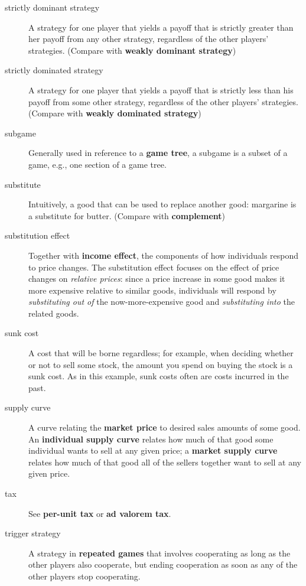 \begin{description}
\item[strictly dominant strategy] A strategy for one player that yields a payoff that is strictly greater than her payoff from any other strategy, regardless of the other players' strategies. (Compare with \textbf{weakly dominant strategy})

\item[strictly dominated strategy] A strategy for one player that yields a payoff that is strictly less than his payoff from some other strategy, regardless of the other players' strategies. (Compare with \textbf{weakly dominated strategy})

\item[subgame] Generally used in reference to a \textbf{game tree}, a subgame is a subset of a game, e.g., one section of a game tree.

\item[substitute] Intuitively, a good that can be used to replace another good: margarine is a substitute for butter.  (Compare with \textbf{complement})

\item[substitution effect] Together with \textbf{income effect}, the components of how individuals respond to price changes. The substitution effect focuses on the effect of price changes on \emph{relative prices}: since a price increase in some good makes it more expensive relative to similar goods, individuals will respond by \emph{substituting out of} the now-more-expensive good and \emph{substituting into} the related goods. 

\item[sunk cost] A cost that will be borne regardless; for example, when deciding whether or not to sell some stock, the amount you spend on buying the stock is a sunk cost. As in this example, sunk costs often are costs incurred in the past.

\item[supply curve] A curve relating the \textbf{market price} to desired sales amounts of some good. An \textbf{individual supply curve} relates how much of that good some individual wants to sell at any given price; a \textbf{market supply curve} relates how much of that good all of the sellers together want to sell at any given price.

\item[tax] See \textbf{per-unit tax} or \textbf{ad valorem tax}.

\item[trigger strategy] A strategy in \textbf{repeated games} that involves cooperating as long as the other players also cooperate, but ending cooperation as soon as any of the other players stop cooperating. 


\end{description}
